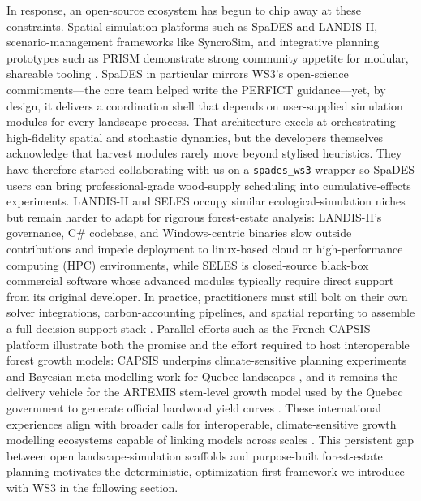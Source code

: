 \documentclass[review]{elsarticle}
\begin{document}
In response, an open-source ecosystem has begun to chip away at these constraints. Spatial simulation platforms such as SpaDES and LANDIS-II, scenario-management frameworks like SyncroSim, and integrative planning prototypes such as PRISM demonstrate strong community appetite for modular, shareable tooling \citep{spades, landisii, syncrosim, nguyen2022prism}. SpaDES in particular mirrors WS3's open-science commitments---the core team helped write the PERFICT guidance---yet, by design, it delivers a coordination shell that depends on user-supplied simulation modules for every landscape process. That architecture excels at orchestrating high-fidelity spatial and stochastic dynamics, but the developers themselves acknowledge that harvest modules rarely move beyond stylised heuristics. They have therefore started collaborating with us on a \texttt{spades\_ws3} wrapper so SpaDES users can bring professional-grade wood-supply scheduling into cumulative-effects experiments. LANDIS-II and SELES occupy similar ecological-simulation niches but remain harder to adapt for rigorous forest-estate analysis: LANDIS-II's governance, C\# codebase, and Windows-centric binaries slow outside contributions and impede deployment to linux-based cloud or high-performance computing (HPC) environments, while SELES is closed-source black-box commercial software whose advanced modules typically require direct support from its original developer. In practice, practitioners must still bolt on their own solver integrations, carbon-accounting pipelines, and spatial reporting to assemble a full decision-support stack \citep{daigneault2022forest, law2018land}. Parallel efforts such as the French CAPSIS platform illustrate both the promise and the effort required to host interoperable forest growth models: CAPSIS underpins climate-sensitive planning experiments \citep{fortin2022altframework} and Bayesian meta-modelling work for Quebec landscapes \citep{fortin2022metamodel}, and it remains the delivery vehicle for the ARTEMIS stem-level growth model used by the Quebec government to generate official hardwood yield curves \citep{power2015artemis}. These international experiences align with broader calls for interoperable, climate-sensitive growth modelling ecosystems capable of linking models across scales \citep{gilson2025climatesensitive}. This persistent gap between open landscape-simulation scaffolds and purpose-built forest-estate planning motivates the deterministic, optimization-first framework we introduce with WS3 in the following section.
\end{document}

